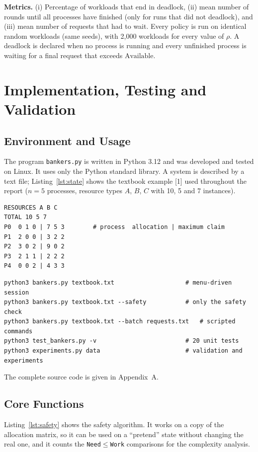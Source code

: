 \documentclass[11pt,a4paper]{report}
\begin{document}
\textbf{Metrics.} (i) Percentage of workloads that end in deadlock, (ii) mean number of rounds until all processes have finished (only for runs that did not deadlock), and (iii) mean number of requests that had to wait. Every policy is run on identical random workloads (same seeds), with 2{,}000 workloads for every value of $\rho$. A deadlock is declared when no process is running and every unfinished process is waiting for a final request that exceeds $\text{Available}$.

\section{Implementation, Testing and Validation}
\subsection{Environment and Usage}
The program \texttt{bankers.py} is written in Python 3.12 and was developed and tested on Linux. It uses only the Python standard library. A system is described by a text file; Listing~\ref{lst:state} shows the textbook example [1] used throughout the report ($n=5$ processes, resource types $A$, $B$, $C$ with 10, 5 and 7 instances).

\begin{lstlisting}[style=term,caption={State file \texttt{textbook.txt}.},label={lst:state}]
RESOURCES A B C
TOTAL 10 5 7
P0  0 1 0 | 7 5 3        # process  allocation | maximum claim
P1  2 0 0 | 3 2 2
P2  3 0 2 | 9 0 2
P3  2 1 1 | 2 2 2
P4  0 0 2 | 4 3 3
\end{lstlisting}

\begin{lstlisting}[style=term,caption={Ways of running the program.},label={lst:usage}]
python3 bankers.py textbook.txt                    # menu-driven session
python3 bankers.py textbook.txt --safety           # only the safety check
python3 bankers.py textbook.txt --batch requests.txt   # scripted commands
python3 test_bankers.py -v                         # 20 unit tests
python3 experiments.py data                        # validation and experiments
\end{lstlisting}

The complete source code is given in Appendix~A.

\subsection{Core Functions}
Listing~\ref{lst:safety} shows the safety algorithm. It works on a copy of the allocation matrix, so it can be used on a ``pretend'' state without changing the real one, and it counts the \texttt{Need}$\le$\texttt{Work} comparisons for the complexity analysis.
\end{document}
